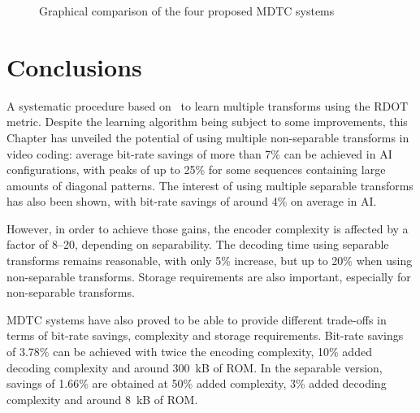\documentclass[11pt,a4paper,openright,twoside]{book}
\numberwithin{equation}{section} %
\numberwithin{figure}{section} %
\numberwithin{table}{section} %
\begin{document}
\begin{figure}[tb]
	\def\scale{0.26}
	\def\encmax{2000}
	\def\decmax{130}
	\def\bdrmax{-8}
	\def\rommax{8192}
	\centering
	\def\bdr{-1.66}
	\def\enc{150}
	\def\dec{103}
	\def\rom{8.20}
	\def\bdr{-3.78}
	\def\enc{200}
	\def\dec{110}
	\def\rom{148.75}

	\def\bdr{-4.10}
	\def\enc{800}
	\def\dec{105}
	\def\rom{236.25}
	\def\bdr{-7.10}
	\def\enc{2000}
	\def\dec{120}
	\def\rom{4618.24}
	\caption{Graphical comparison of the four proposed \acs{MDTC} systems}
	\label{fig:four_way_mdtc_comparison}
\end{figure}

\section{Conclusions}
\label{sec:mdtc_conclusions}

A systematic procedure based on~\cite{sezer-08-sparse-orthonormal-transforms}
to learn multiple transforms using the \ac{RDOT} metric.
Despite the learning algorithm being subject to some improvements, this
Chapter has unveiled the potential of using multiple non-separable transforms
in video coding:
average bit-rate savings of more than 7\% can be achieved in \ac{AI}
configurations, with peaks of up to 25\% for some sequences containing large
amounts of diagonal patterns.
The interest of using multiple separable transforms has also been shown, with
bit-rate savings of around 4\% on average in \ac{AI}.

However, in order to achieve those gains, the encoder complexity is affected
by a factor of 8--20, depending on separability.
The decoding time using separable transforms remains reasonable, with only 5\%
increase, but up to 20\% when using non-separable transforms.
Storage requirements are also important, especially for non-separable
transforms.

\ac{MDTC} systems have also proved to be able to provide different trade-offs
in terms of bit-rate savings, complexity and storage requirements.
Bit-rate savings of 3.78\% can be achieved with twice the encoding complexity,
10\% added decoding complexity and around \SI{300}{\kilo B} of \acs{ROM}.
In the separable version, savings of 1.66\% are obtained at 50\% added
complexity, 3\% added decoding complexity and around \SI{8}{\kilo B} of
\acs{ROM}.
\end{document}
